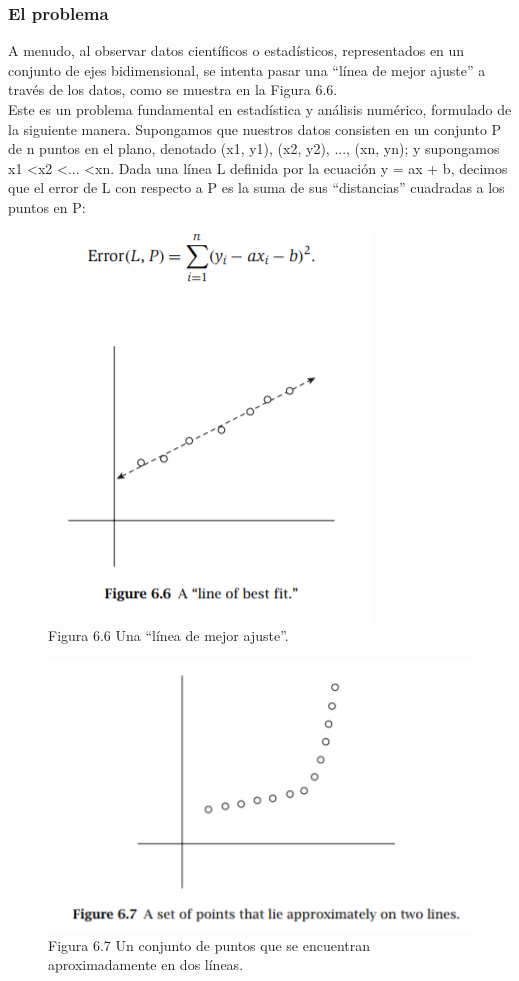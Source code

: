 \documentclass[a4paper, 12pt]{book}
\theoremstyle{dotless}
\begin{document}
\subsubsection*{El problema}

A menudo, al observar datos científicos o estadísticos, representados en un conjunto de ejes bidimensional, se intenta pasar una ``línea de mejor ajuste'' a través de los datos, como se muestra en la Figura 6.6.\\

Este es un problema fundamental en estadística y análisis numérico, formulado de la siguiente manera. Supongamos que nuestros datos consisten en un conjunto P de n puntos en el plano, denotado (x1, y1), (x2, y2), ..., (xn, yn); y supongamos x1 <x2 <... <xn. Dada una línea L definida por la ecuación y = ax + b, decimos que el error de L con respecto a P es la suma de sus ``distancias'' cuadradas a los puntos en P:\\

\begin{figure}[h]
\centering
\includegraphics[scale=1]{Imagenes-Seccion6/fig6_6.PNG}
\caption{Figura 6.6 Una ``línea de mejor ajuste''.}
\end{figure}

\begin{figure}[h]
\centering
\includegraphics[scale=1]{Imagenes-Seccion6/fig6_7.PNG}
\caption{Figura 6.7 Un conjunto de puntos que se encuentran aproximadamente en dos líneas.}
\end{figure}
\end{document}
